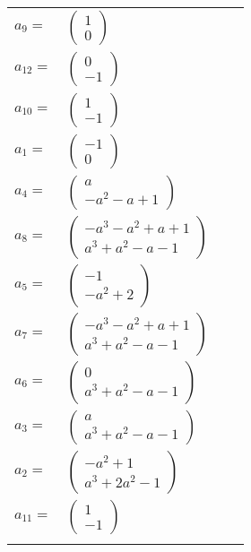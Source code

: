 \documentclass[1p]{elsarticle_modified}
\theoremstyle{definition}
\begin{document}
\begin{tabular}{m{7pt} m{180pt} m{7pt} m{180pt} }
\flushright $a_{9}=$&$\begin{pmatrix}1\\0\end{pmatrix}$ \\
\flushright $a_{12}=$&$\begin{pmatrix}0\\-1\end{pmatrix}$ \\
\flushright $a_{10}=$&$\begin{pmatrix}1\\-1\end{pmatrix}$ \\
\flushright $a_{1}=$&$\begin{pmatrix}-1\\0\end{pmatrix}$ \\
\flushright $a_{4}=$&$\begin{pmatrix}a\\- a^2- a+1\end{pmatrix}$ \\
\flushright $a_{8}=$&$\begin{pmatrix}- a^3- a^2+a+1\\a^3+a^2- a-1\end{pmatrix}$ \\
\flushright $a_{5}=$&$\begin{pmatrix}-1\\- a^2+2\end{pmatrix}$ \\
\flushright $a_{7}=$&$\begin{pmatrix}- a^3- a^2+a+1\\a^3+a^2- a-1\end{pmatrix}$ \\
\flushright $a_{6}=$&$\begin{pmatrix}0\\a^3+a^2- a-1\end{pmatrix}$ \\
\flushright $a_{3}=$&$\begin{pmatrix}a\\a^3+a^2- a-1\end{pmatrix}$ \\
\flushright $a_{2}=$&$\begin{pmatrix}- a^2+1\\a^3+2 a^2-1\end{pmatrix}$ \\
\flushright $a_{11}=$&$\begin{pmatrix}1\\-1\end{pmatrix}$\\&\end{tabular}
\end{document}

